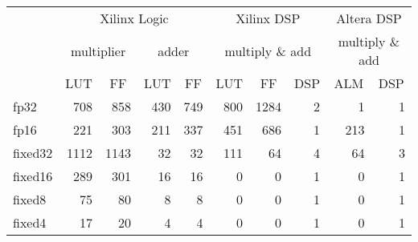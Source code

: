 \begin{table}[htbp]
    \centering
    \caption{}
      \begin{tabular}{|l|r|r|r|r|r|r|r|r|r|} \hline
      \multirow{2}[4]{*}{} & \multicolumn{4}{c|}{Xilinx Logic} & \multicolumn{3}{c|}{Xilinx DSP} & \multicolumn{2}{c|}{Altera DSP} \\ \cline{2-10}         
       & \multicolumn{2}{c|}{multiplier} & \multicolumn{2}{c|}{adder} & \multicolumn{3}{c|}{multiply \& add} & \multicolumn{2}{c|}{multiply \& add} \\ \cline{2-10}
            & \multicolumn{1}{c|}{LUT} & \multicolumn{1}{c|}{FF} & \multicolumn{1}{c|}{LUT} & \multicolumn{1}{c|}{FF} & \multicolumn{1}{c|}{LUT} & \multicolumn{1}{c|}{FF} & \multicolumn{1}{c|}{DSP} & \multicolumn{1}{c|}{ALM} & \multicolumn{1}{c|}{DSP} \\ \hline
      fp32  & 708   & 858   & 430   & 749   & 800   & 1284  & 2     & 1     & 1 \\ \hline
      fp16  & 221   & 303   & 211   & 337   & 451   & 686   & 1     & 213   & 1 \\ \hline
      fixed32 & 1112  & 1143  & 32    & 32    & 111   & 64    & 4     & 64    & 3 \\ \hline
      fixed16 & 289   & 301   & 16    & 16    & 0     & 0     & 1     & 0     & 1 \\ \hline
      fixed8 & 75    & 80    & 8     & 8     & 0     & 0     & 1     & 0     & 1 \\ \hline
      fixed4 & 17    & 20    & 4     & 4     & 0     & 0     & 1     & 0     & 1 \\ \hline
      \end{tabular}
    \label{tab:mac}
  \end{table}
  